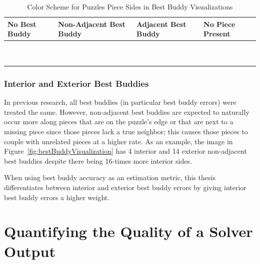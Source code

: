 \documentclass{report}
\begin{document}
\begin{table}
\begin{center}
  \begin{tabular}{ | >{\centering\arraybackslash}m{0.9in} | >{\centering\arraybackslash}m{0.9in} | >{\centering\arraybackslash}m{0.9in} | >{\centering\arraybackslash}m{0.9in} | }
  
   \hline
    No Best Buddy & Non-Adjacent Best Buddy & Adjacent Best Buddy & No Piece Present  \\ \hline
	{\cellcolor{white}~} & {\cellcolor{red}~} & {\cellcolor{green}~} & {\cellcolor{black}~}  \\
	{\cellcolor{white}~} & {\cellcolor{red}~} & {\cellcolor{green}~} & {\cellcolor{black}~}  \\
 \hline

  \end{tabular}
\end{center}
\caption{Color Scheme for Puzzles Piece Sides in Best Buddy Visualizations}\label{tab:bestBuddyColors}
\end{table}

\subsubsection{Interior and Exterior Best Buddies}\label{sec:interiorExteriorBestBuddies}

In previous research, all best buddies (in particular best buddy errors) were treated the same.  However, non-adjacent best buddies are expected to naturally occur more along pieces that are on the puzzle's edge or that are next to a missing piece since those pieces lack a true neighbor; this causes those pieces to couple with unrelated pieces at a higher rate.  As an example, the image in Figure~\ref{fig:bestBuddyVisualization} has 4 interior and 14 exterior non-adjacent best buddies despite there being 16-times more interior sides. 

When using best buddy accuracy as an estimation metric, this thesis differentiates between interior and exterior best buddy errors by giving interior best buddy errors a higher weight.







\pagebreak
\section{Quantifying the Quality of a Solver Output}\label{sec:quantifyingSolverQuantify}
\end{document}
